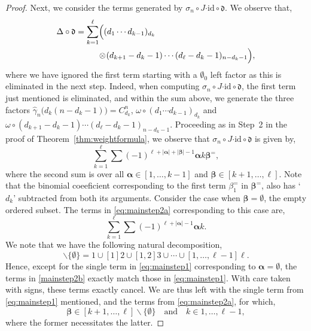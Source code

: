 \documentclass[10pt,a4paper]{amsart}
\newcommand*{\balpha}{\boldsymbol{\alpha}}
\newcommand*{\bbeta}{\boldsymbol{\beta}}
\newcommand*{\cendot}{\boldsymbol{\cdot}}
\newcommand*{\df}{\mathfrak d}
\newcommand*{\id}{{\mathrm{id}}}
\begin{document}
\begin{proof}
Next, we consider the terms generated by $\sigma_n\circ J\cendot\id\circ\df$. We observe that,
\begin{align*}
  \Delta\circ\df=\sum_{k=1}^\ell&\Bigl((d_1\cdots d_{k-1})_{d_k}\\
                               &\!\otimes\!(d_{k+1}-d_k-1)\cdots(d_\ell-d_k-1)_{n-d_k-1}\Bigr),
\end{align*}
where we have ignored the first term starting with a $\emptyset_0$ left factor as this is eliminated in the next step.
Indeed, when computing $\sigma_n\circ J\cendot\id\circ\df$, the first term just mentioned is eliminated, and within the sum above,
we generate the three factors $\hat{\gamma}_n\bigl(d_k(n-d_k-1)\bigr)=C_{d_k}^n$, $\omega\circ(d_1\cdots d_{k-1})_{d_k}$ and $\omega\circ(d_{k+1}-d_k-1)\cdots(d_\ell-d_k-1)_{n-d_k-1}$.
Proceeding as in Step~2 in the proof of Theorem~\ref{thm:weightformula}, we observe that $\sigma_n\circ J\cendot\id\circ\df$ is given by,
\begin{equation}
  \sum_{k=1}^\ell\sum(-1)^{\ell+|\balpha|+|\bbeta|-1}\balpha k\bbeta^=,\label{eq:mainstep2a}
\end{equation}
where the second sum is over all $\balpha\in[1,\ldots,k-1]$ and $\bbeta\in[k+1,\ldots,\ell]$.
Note that the binomial coeeficient corresponding to the first term $\beta_1^=$ in $\bbeta^=$, also has `$d_k$' subtracted from both its arguments.
Consider the case when $\bbeta=\emptyset$, the empty ordered subset. The terms in \eqref{eq:mainstep2a} corresponding to this case are,
\begin{equation}\label{mainstep2b}
  \sum_{k=1}^\ell\sum(-1)^{\ell+|\balpha|-1}\balpha k.
\end{equation}
We note that we have the following natural decomposition,
\begin{equation*}
[1,\ldots,\ell]\backslash\{\emptyset\}=1\cup[1]2\cup[1,2]3\cup\cdots\cup[1,\ldots,\ell-1]\ell.
\end{equation*}
Hence, except for the single term in \eqref{eq:mainstep1} corresponding to $\balpha=\emptyset$, the terms in \eqref{mainstep2b} exactly match those in \eqref{eq:mainstep1}.
With care taken with signs, these terms exactly cancel. We are thus left with the single term from \eqref{eq:mainstep1} mentioned, and the terms from \eqref{eq:mainstep2a}, for which,
\begin{equation}\label{eq:mainconds2}
  \bbeta\in[k+1,\ldots,\ell]\backslash\{\emptyset\}\quad\text{and}\quad k\in1,\ldots,\ell-1,
\end{equation}
where the former necessitates the latter.


\end{proof}
\end{document}
